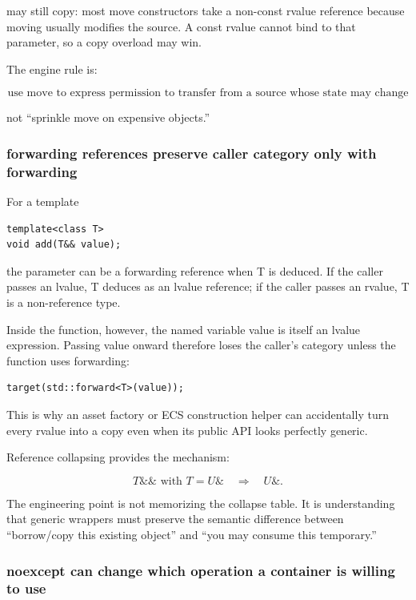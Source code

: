 may still copy: most move constructors take a non-const rvalue reference because moving usually modifies the source. A const rvalue cannot bind to that parameter, so a copy overload may win.

The engine rule is:

\[
\boxed{
\text{use move to express permission to transfer from a source whose state may change}
}
\]

not ``sprinkle move on expensive objects.''

\subsubsection{forwarding references preserve caller category only with forwarding}\label{01-foundations-i-ch005-forwarding-references-preserve-caller-category-only-with-forwarding}

\hypertarget{01-foundations-i-ch005-forwarding-references-preserve-caller-category-only-with-forwarding}{}

For a template

\begin{verbatim}
template<class T>
void add(T&& value);
\end{verbatim}

the parameter can be a forwarding reference when T is deduced. If the caller passes an lvalue, T deduces as an lvalue reference; if the caller passes an rvalue, T is a non-reference type.

Inside the function, however, the named variable value is itself an lvalue expression. Passing value onward therefore loses the caller's category unless the function uses forwarding:

\begin{verbatim}
target(std::forward<T>(value));
\end{verbatim}

This is why an asset factory or ECS construction helper can accidentally turn every rvalue into a copy even when its public API looks perfectly generic.

Reference collapsing provides the mechanism:

\[
T\&\& \text{ with } T=U\&
\quad\Rightarrow\quad
U\&.
\]

The engineering point is not memorizing the collapse table. It is understanding that generic wrappers must preserve the semantic difference between ``borrow/copy this existing object'' and ``you may consume this temporary.''

\subsubsection{noexcept can change which operation a container is willing to use}\label{01-foundations-i-ch005-noexcept-can-change-which-operation-a-container-is-willing-to-use}

